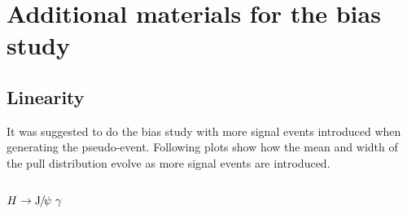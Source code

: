 \chapter{Additional materials for the bias study}
\label{sec:Appendix_bias}

\section{Linearity}
It was suggested to do the bias study with more signal events introduced when generating the pseudo-event. 
Following plots show how the mean and width of the pull distribution evolve as more signal events are introduced.
\clearpage
\subsection{$H\to \JPsi\ \gamma$}
